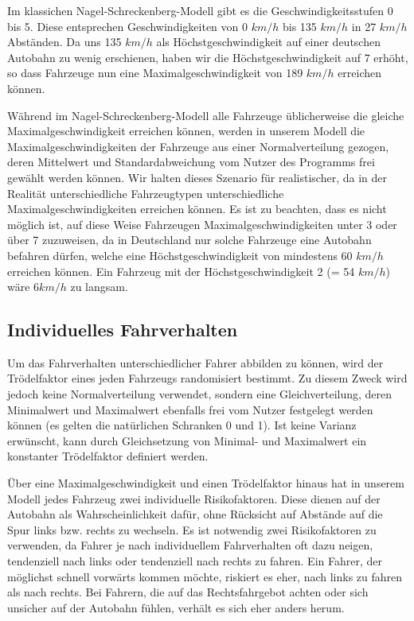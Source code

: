 \documentclass[10pt, a4paper]{article}
\newcommand\nsm{Nagel-Schreckenberg-Modell }
\begin{document}
Im klassichen \nsm gibt es die Geschwindigkeitsstufen 0 bis 5. Diese entsprechen Geschwindigkeiten von 0 $km/h$ bis 135 $km/h$ in 27 $km/h$ Abständen. Da uns 135 $km/h$ als Höchstgeschwindigkeit auf einer deutschen Autobahn zu wenig erschienen, haben wir die Höchstgeschwindigkeit auf 7 erhöht, so dass Fahrzeuge nun eine Maximalgeschwindigkeit von 189 $km/h$ erreichen können.

Während im \nsm alle Fahrzeuge üblicherweise die gleiche Maximalgeschwindigkeit erreichen können, werden in unserem Modell die Maximalgeschwindigkeiten der Fahrzeuge aus einer Normalverteilung gezogen, deren Mittelwert und Standardabweichung vom Nutzer des Programms frei gewählt werden können. Wir halten dieses Szenario für realistischer, da in der Realität unterschiedliche Fahrzeugtypen unterschiedliche Maximalgeschwindigkeiten erreichen können. Es ist zu beachten, dass es nicht möglich ist, auf diese Weise Fahrzeugen Maximalgeschwindigkeiten unter 3 oder über 7 zuzuweisen, da in Deutschland nur solche Fahrzeuge eine Autobahn befahren dürfen, welche eine Höchstgeschwindigkeit von mindestens 60 $km/h$ erreichen können. Ein Fahrzeug mit der Höchstgeschwindigkeit 2 (= 54 $km/h$) wäre $6km/h$ zu langsam.

\subsection{Individuelles Fahrverhalten}

Um das Fahrverhalten unterschiedlicher Fahrer abbilden zu können, wird der Trödelfaktor eines jeden Fahrzeugs randomisiert bestimmt. Zu diesem Zweck wird jedoch keine Normalverteilung verwendet, sondern eine Gleichverteilung, deren Minimalwert und Maximalwert ebenfalls frei vom Nutzer festgelegt werden können (es gelten die natürlichen Schranken 0 und 1). Ist keine Varianz erwünscht, kann durch Gleichsetzung von Minimal- und Maximalwert ein konstanter Trödelfaktor definiert werden.

Über eine Maximalgeschwindigkeit und einen Trödelfaktor hinaus hat in unserem Modell jedes Fahrzeug zwei individuelle Risikofaktoren. Diese dienen auf der Autobahn als Wahrscheinlichkeit dafür, ohne Rücksicht auf Abstände auf die Spur links bzw. rechts zu wechseln. Es ist notwendig zwei Risikofaktoren zu verwenden, da Fahrer je nach individuellem Fahrverhalten oft dazu neigen, tendenziell nach links oder tendenziell nach rechts zu fahren. Ein Fahrer, der möglichst schnell vorwärts kommen möchte, riskiert es eher, nach links zu fahren als nach rechts. Bei Fahrern, die auf das Rechtsfahrgebot achten oder sich unsicher auf der Autobahn fühlen, verhält es sich eher anders herum.
\end{document}
